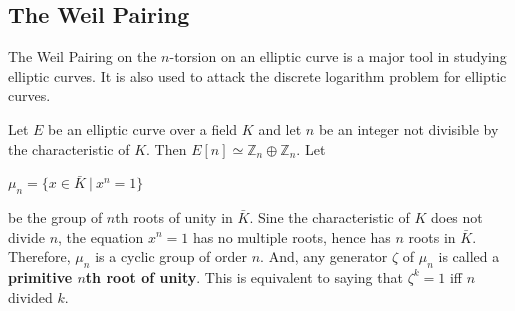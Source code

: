 \documentclass[a4paper, 12pt]{article}
\begin{document}
\subsection{The Weil Pairing}
The Weil Pairing on the $n$-torsion on an elliptic curve is a major tool in studying elliptic curves. It is also used to attack the discrete logarithm problem for elliptic curves. \par
Let $E$ be an elliptic curve over a field $K$ and let $n$ be an integer not divisible by the characteristic of $K$. Then $E[n] \simeq \mathbb{Z}_n \oplus \mathbb{Z}_n$. Let 
\begin{center} $\mu_n = \{x \in \bar{K} \: | \: x^n = 1\}$ \end{center}
be the group of $n$th roots of unity in $\bar{K}$. Sine the characteristic of $K$ does not divide $n$, the equation $x^n=1$ has no multiple roots, hence has $n$ roots in $\bar{K}$. Therefore, $\mu_n$ is a cyclic group of order $n$. And, any generator $\zeta$ of $\mu_n$ is called a \textbf{primitive $n$th root of unity}. This is equivalent to saying that $\zeta^k = 1$ iff $n$ divided $k$. 
\end{document}
